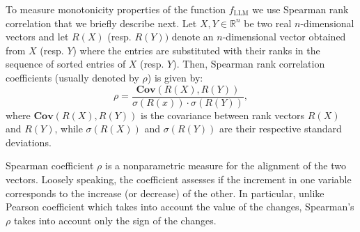     
    
  

To measure monotonicity properties of the function $f_{\text{LLM}}$ we use Spearman rank correlation that we briefly describe next. Let $X, Y\in \mathbb{R}^n$ be two real $n$-dimensional vectors and let $R(X)$ (resp. $R(Y))$ denote an $n$-dimensional vector obtained from $X$ (resp. $Y$) where the entries are substituted with their ranks in the sequence of sorted entries of $X$ (resp. $Y$). Then, Spearman rank correlation coefficients (usually denoted by $\rho$) is given by:
\begin{equation}\label{eq spearman general}
    \rho=\frac{\textbf{Cov}(R(X),R(Y))}{\sigma(R(x))\cdot\sigma(R(Y))},
\end{equation}
where $\textbf{Cov}(R(X),R(Y))$ is the covariance between rank vectors $R(X)$ and $R(Y)$, while $\sigma(R(X))$ and $\sigma(R(Y))$ are their respective standard deviations. 

Spearman coefficient $\rho$ is a nonparametric measure for the alignment of the two vectors. Loosely speaking, the coefficient assesses if the increment in one variable corresponds to the increase (or decrease) of the other. In particular, unlike Pearson coefficient which takes into account the value of the changes, Spearman's $\rho$ takes into account only the sign of the changes. 



